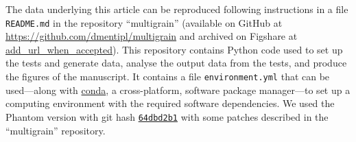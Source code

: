 \documentclass[fleqn,usenatbib]{mnras}
\begin{document}
The data underlying this article can be reproduced following instructions in a
file \texttt{README.md} in the repository ``multigrain'' (available on GitHub at
\url{https://github.com/dmentipl/multigrain} and archived on Figshare at
\url{add_url_when_accepted}). This repository contains Python code used to set
up the tests and generate data, analyse the output data from the tests, and
produce the figures of the manuscript. It contains a file
\texttt{environment.yml} that can be used---along with
\href{https://conda.io/}{conda}, a cross-platform, software package manager---to
set up a computing environment with the required software dependencies. We used
the Phantom version with git hash
\href{https://github.com/danieljprice/phantom/commit/64dbd2b124ca74051eed920d6cad0a2e83157478}{\texttt{64dbd2b1}}
with some patches described in the ``multigrain'' repository.














\bsp %
\label{lastpage}
\end{document}
